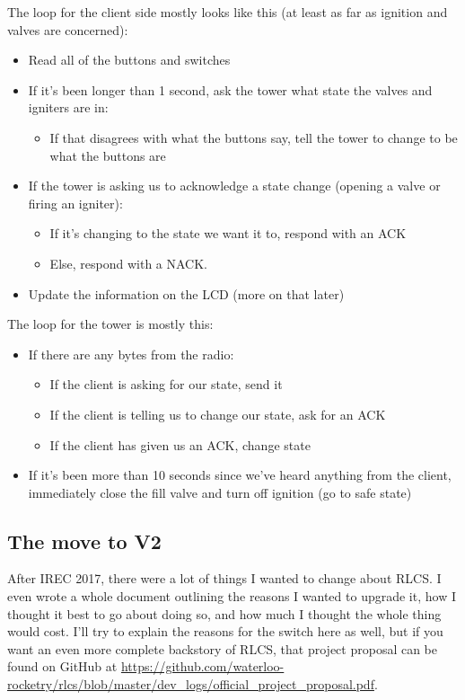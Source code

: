 \documentclass[11pt]{article}
\begin{document}
The loop for the client side mostly looks like this (at least as far as ignition
and valves are concerned):
\begin{itemize}
\item Read all of the buttons and switches
\item If it's been longer than 1 second, ask the tower what state the valves and
igniters are in:
\begin{itemize}
\item If that disagrees with what the buttons say, tell the tower to change to be
what the buttons are
\end{itemize}
\item If the tower is asking us to acknowledge a state change (opening a valve or
firing an igniter):
\begin{itemize}
\item If it's changing to the state we want it to, respond with an ACK
\item Else, respond with a NACK.
\end{itemize}
\item Update the information on the LCD (more on that later)
\end{itemize}

The loop for the tower is mostly this:
\begin{itemize}
\item If there are any bytes from the radio:
\begin{itemize}
\item If the client is asking for our state, send it
\item If the client is telling us to change our state, ask for an ACK
\item If the client has given us an ACK, change state
\end{itemize}
\item If it's been more than 10 seconds since we've heard anything from the client,
immediately close the fill valve and turn off ignition (go to safe state)
\end{itemize}
\subsection{The move to V2}
\label{sec:org35abe2b}

After IREC 2017, there were a lot of things I wanted to change about RLCS. I
even wrote a whole document outlining the reasons I wanted to upgrade it, how I
thought it best to go about doing so, and how much I thought the whole thing
would cost. I'll try to explain the reasons for the switch here as well, but if
you want an even more complete backstory of RLCS, that project proposal can be
found on GitHub at
\url{https://github.com/waterloo-rocketry/rlcs/blob/master/dev\_logs/official\_project\_proposal.pdf}.
\end{document}
